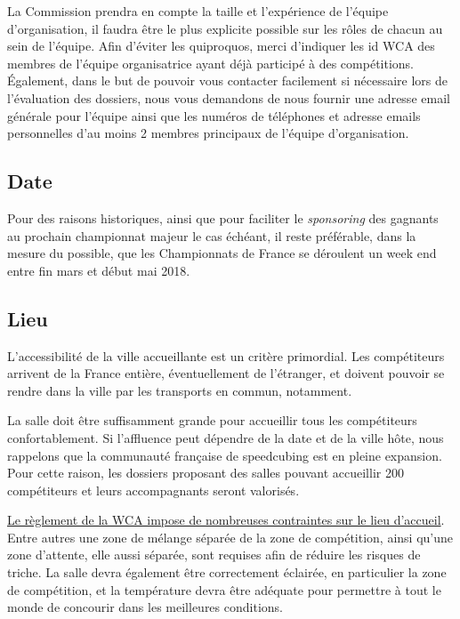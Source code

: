 \documentclass[a4paper,12pt]{scrartcl}
\begin{document}
La Commission prendra en compte la taille et l'expérience de l'équipe d'organisation, il faudra être le plus explicite possible sur les rôles de chacun au sein de l'équipe. Afin d'éviter les quiproquos, merci d'indiquer les id WCA des membres de l'équipe organisatrice ayant déjà participé à des compétitions. Également, dans le but de pouvoir vous contacter facilement si nécessaire lors de l'évaluation des dossiers, nous vous demandons de nous fournir une adresse email générale pour l'équipe ainsi que les numéros de téléphones et adresse emails personnelles d'au moins 2 membres principaux de l'équipe d'organisation.


\subsection*{Date}

Pour des raisons historiques, ainsi que pour faciliter le \emph{sponsoring} des gagnants au prochain championnat majeur le cas échéant, il reste préférable, dans la mesure du possible, que les Championnats de France se déroulent un week end entre fin mars et début mai 2018.


\subsection*{Lieu}

L'accessibilité de la ville accueillante est un critère primordial. Les compétiteurs arrivent de la France entière, éventuellement de l'étranger, et doivent pouvoir se rendre dans la ville par les transports en commun, notamment.

La salle doit être suffisamment grande pour accueillir tous les compétiteurs confortablement.
Si l'affluence peut dépendre de la date et de la ville hôte, nous rappelons que la communauté française de speedcubing est en pleine expansion. Pour cette raison, les dossiers proposant des salles pouvant accueillir 200 compétiteurs et leurs accompagnants seront valorisés.

\href{https://www.worldcubeassociation.org/regulations/translations/french/#article-7-environment}{Le règlement de la WCA impose de nombreuses contraintes sur le lieu d'accueil}.
Entre autres une zone de mélange séparée de la zone de compétition, ainsi qu'une zone d'attente, elle aussi séparée, sont requises afin de réduire les risques de triche.
La salle devra également être correctement éclairée, en particulier la zone de compétition, et la température devra être adéquate pour permettre à tout le monde de concourir dans les meilleures conditions.
\end{document}
